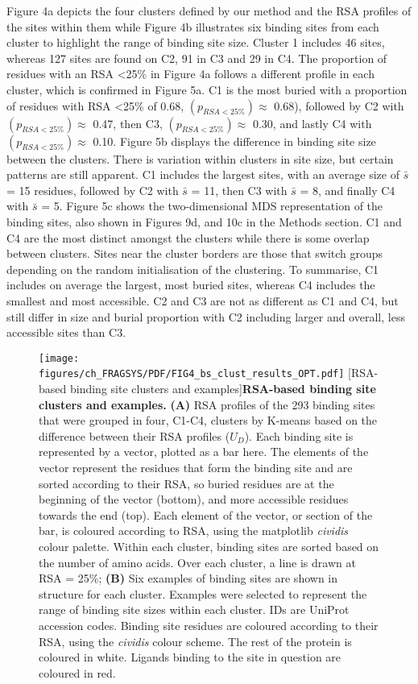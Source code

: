 Figure 4a depicts the four clusters defined by our method and the RSA profiles of the sites within them while Figure 4b illustrates six binding sites from each cluster to highlight the range of binding site size. Cluster 1 includes 46 sites, whereas 127 sites are found on C2, 91 in C3 and 29 in C4. The proportion of residues with an RSA \textless 25\% in Figure 4a follows a different profile in each cluster, which is confirmed in Figure 5a. C1 is the most buried with a proportion of residues with RSA \textless 25\% of 0.68, $(p_{RSA<25\%}) \approx$ 0.68), followed by C2 with $(p_{RSA<25\%}) \approx$ 0.47, then C3, $(p_{RSA<25\%}) \approx$ 0.30, and lastly C4 with $(p_{RSA<25\%}) \approx$ 0.10. Figure 5b displays the difference in binding site size between the clusters. There is variation within clusters in site size, but certain patterns are still apparent. C1 includes the largest sites, with an average size of $\bar{s}$ = 15 residues, followed by C2 with $\bar{s}$ = 11, then C3 with $\bar{s}$ = 8, and finally C4 with $\bar{s}$ = 5. Figure 5c shows the two-dimensional MDS representation of the binding sites, also shown in Figures 9d, and 10c in the Methods section. C1 and C4 are the most distinct amongst the clusters while there is some overlap between clusters. Sites near the cluster borders are those that switch groups depending on the random initialisation of the clustering. To summarise, C1 includes on average the largest, most buried sites, whereas C4 includes the smallest and most accessible. C2 and C3 are not as different as C1 and C4, but still differ in size and burial proportion with C2 including larger and overall, less accessible sites than C3.

\begin{figure}[htbp]
    \centering
    \texttt{[image: figures/ch\_FRAGSYS/PDF/FIG4\_bs\_clust\_results\_OPT.pdf]}
    [RSA-based binding site clusters and examples]{\textbf{RSA-based binding site clusters and examples.} \textbf{(A)} RSA profiles of the 293 binding sites that were grouped in four, C1-C4, clusters by K-means based on the difference between their RSA profiles ($U_{D}$). Each binding site is represented by a vector, plotted as a bar here. The elements of the vector represent the residues that form the binding site and are sorted according to their RSA, so buried residues are at the beginning of the vector (bottom), and more accessible residues towards the end (top). Each element of the vector, or section of the bar, is coloured according to RSA, using the matplotlib  \textit{cividis} colour palette. Within each cluster, binding sites are sorted based on the number of amino acids. Over each cluster, a line is drawn at RSA = 25\%; \textbf{(B)} Six examples of binding sites are shown in structure for each cluster. Examples were selected to represent the range of binding site sizes within each cluster. IDs are UniProt accession codes. Binding site residues are coloured according to their RSA, using the \textit{cividis} colour scheme. The rest of the protein is coloured in white. Ligands binding to the site in question are coloured in red.}
\label{fig:bss_clust_results}
\end{figure}

